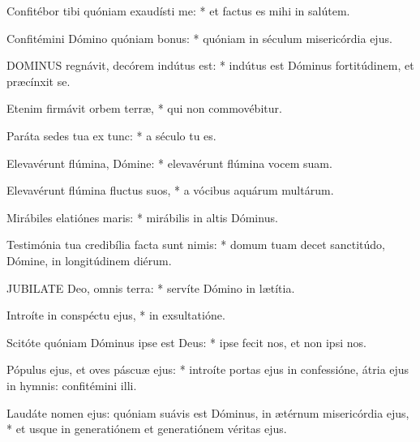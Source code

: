 Confitébor tibi quóniam exaudísti me: * et factus es mihi in salútem.

Confitémini Dómino quóniam bonus: * quóniam in séculum misericórdia ejus.



\lettrine[lines=2]{D}{OMINUS} regnávit, decórem indútus est: * indútus est Dóminus fortitúdinem, et præcínxit se.

Etenim firmávit orbem terræ, * qui non commovébitur.

Paráta sedes tua ex tunc: * a século tu es.

Elevavérunt flúmina, Dómine: * elevavérunt flúmina vocem suam.

Elevavérunt flúmina fluctus suos, * a vócibus aquárum multárum.

Mirábiles elatiónes maris: * mirábilis in altis Dóminus.

Testimónia tua credibília facta sunt nimis: * domum tuam decet sanctitúdo, Dómine, in longitúdinem diérum.


\lettrine[lines=2]{J}{UBILATE} Deo, omnis terra: * servíte Dómino in lætítia.

Introíte in conspéctu ejus, * in exsultatióne.

Scitóte quóniam Dóminus ipse est Deus: * ipse fecit nos, et non ipsi nos.

Pópulus ejus, et oves páscuæ ejus: * introíte portas ejus in confessióne, átria ejus in hymnis: confitémini illi.

Laudáte nomen ejus: quóniam suávis est Dóminus, in ætérnum misericórdia ejus, * et usque in generatiónem et generatiónem véritas ejus.


